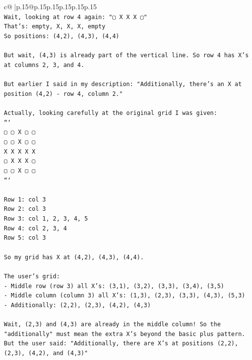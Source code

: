 \documentclass{article}
\begin{document}
{\begin{supertabular}{c@{$\;$}|p{.15\linewidth}@{}p{.15\linewidth}p{.15\linewidth}p{.15\linewidth}p{.15\linewidth}p{.15\linewidth}}
{{{\\ 
\texttt{Wait, looking at row 4 again: "▢ X X X ▢"} \\
\texttt{That's: empty, X, X, X, empty} \\
\texttt{So positions: (4,2), (4,3), (4,4)} \\
\\ 
\texttt{But wait, (4,3) is already part of the vertical line. So row 4 has X's at columns 2, 3, and 4.} \\
\\ 
\texttt{But earlier I said in my description: "Additionally, there's an X at position (4,2) {-} row 4, column 2."} \\
\\ 
\texttt{Actually, looking carefully at the original grid I was given:} \\
\texttt{```} \\
\texttt{▢ ▢ X ▢ ▢} \\
\texttt{▢ ▢ X ▢ ▢} \\
\texttt{X X X X X} \\
\texttt{▢ X X X ▢} \\
\texttt{▢ ▢ X ▢ ▢} \\
\texttt{```} \\
\\ 
\texttt{Row 1: col 3} \\
\texttt{Row 2: col 3} \\
\texttt{Row 3: col 1, 2, 3, 4, 5} \\
\texttt{Row 4: col 2, 3, 4} \\
\texttt{Row 5: col 3} \\
\\ 
\texttt{So my grid has X at (4,2), (4,3), (4,4).} \\
\\ 
\texttt{The user's grid:} \\
\texttt{{-} Middle row (row 3) all X's: (3,1), (3,2), (3,3), (3,4), (3,5)} \\
\texttt{{-} Middle column (column 3) all X's: (1,3), (2,3), (3,3), (4,3), (5,3)} \\
\texttt{{-} Additionally: (2,2), (2,3), (4,2), (4,3)} \\
\\ 
\texttt{Wait, (2,3) and (4,3) are already in the middle column! So the "additionally" must mean the extra X's beyond the basic plus pattern. But the user said: "Additionally, there are X's at positions (2,2), (2,3), (4,2), and (4,3)"} \\
\\ 
}}}
\end{supertabular}}
\end{document}
